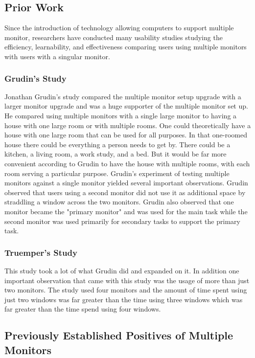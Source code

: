 \documentclass[a4paper]{article}
\begin{document}
\subsection{Prior Work}
Since the introduction of technology allowing computers to support multiple monitor, researchers have conducted many usability studies studying the efficiency, learnability, and effectiveness comparing users using multiple monitors with users with a singular monitor.

\subsubsection{Grudin's Study}
Jonathan Grudin's study compared the multiple monitor setup upgrade with a larger monitor upgrade and was a huge supporter of the multiple monitor set up. He compared using multiple monitors with a single large monitor to having a house with one large room or with multiple rooms. One could theoretically have a house with one large room that can be used for all purposes. In that one-roomed house there could be everything a person needs to get by. There could be a kitchen, a living room, a work study, and a bed. But it would be far more convenient according to Grudin to have the house with multiple rooms, with each room serving a particular purpose.\cite{Grudin} Grudin's experiment of testing multiple monitors against a single monitor yielded several important observations. Grudin observed that users using a second monitor did not use it as additional space by straddling a window across the two monitors.\cite{Grudin} Grudin also observed that one monitor became the "primary monitor" and was used for the main task while the second monitor was used primarily for secondary tasks to support the primary task.

\subsubsection{Truemper's Study}
This study took a lot of what Grudin did and expanded on it. In addition one important observation that came with this study was the usage of more than just two monitors. The study used four monitors and the amount of time spent using just two windows was far greater than the time using three windows which was far greater than the time spend using four windows.

\subsection{Previously Established Positives of Multiple Monitors}
\end{document}

